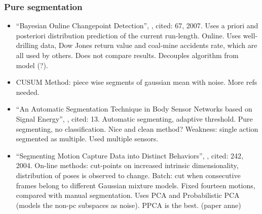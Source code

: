 \subsubsection{Pure segmentation}
\begin{itemize}
  \item ``Bayesian Online Changepoint Detection'', \cite{adams2007bayesian}, cited: 67, 2007. Uses a priori and posteriori distribution prediction of the current run-length. Online. Uses well-drilling data, Dow Jones return value and coal-mine accidents rate, which are all used by others. Does not compare results. Decouples algorithm from model (?).
  \item CUSUM Method: piece wise segments of gaussian mean with noise. More refs needed.
  \item ``An Automatic Segmentation Technique in Body Sensor Networks based on Signal Energy'', \cite{guenterberg2009automatic}, cited: 13. Automatic segmenting, adaptive threshold. Pure segmenting, no classification. Nice and clean method? Weakness: single action segmented as multiple. Used multiple sensors.
  \item ``Segmenting Motion Capture Data into Distinct Behaviors'', \cite{barbivc2004segmenting}, cited: 242, 2004. On-line methods: cut-points on increased intrinsic dimensionality, distribution of poses is observed to change. Batch: cut when consecutive frames belong to different Gaussian mixture models. Fixed fourteen motions, compared with manual segmentation. Uses PCA and Probabilistic PCA (models the non-pc subspaces as noise). PPCA is the best. (paper anne)
\end{itemize}